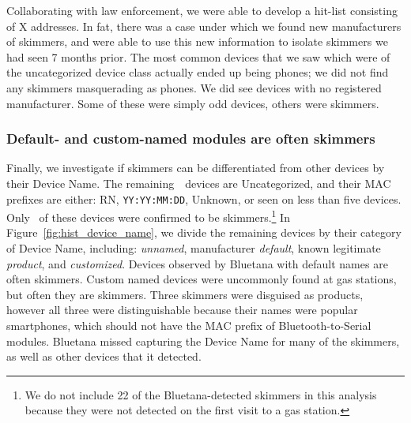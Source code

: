 Collaborating with law
enforcement, we were able to develop a hit-list consisting of X addresses. In
fat, there was a case under which we found new manufacturers of skimmers, and
were able to use this new information to isolate skimmers we had seen 7 months
prior. The most common devices that we saw which were of the uncategorized
device class actually ended up being phones; we did not find any skimmers
masquerading as phones. We did see devices with no registered manufacturer. Some
of these were simply odd devices, others were skimmers.
\fi

\subsubsection*{Default- and custom-named modules are often skimmers} %

Finally, we investigate if skimmers can be differentiated from other devices by
their Device Name.
%
The remaining~\numberBTMACCoDfiltered~devices are Uncategorized, and their MAC prefixes are either: RN, \texttt{YY:YY:MM:DD}, Unknown, or seen on less than five devices.
%
Only
\totalskimmersfirstvisit~of these devices were confirmed to be
skimmers.\footnote{We do not include 22 of the Bluetana-detected skimmers in
this analysis because they were not detected on the first visit to a gas
station.}
%
In Figure~\ref{fig:hist_device_name}, we divide the remaining devices by their
category of Device Name, including: \emph{unnamed}, manufacturer
\emph{default}, known legitimate \emph{product}, and \emph{customized}.
%
Devices observed by Bluetana with default names are often skimmers.
%
Custom named devices were uncommonly found at gas stations, but often they are
skimmers.
%
Three skimmers were disguised as products, however all three were
distinguishable because their names were popular smartphones, which should not
have the MAC prefix of Bluetooth-to-Serial modules.
%
Bluetana missed capturing the Device Name for many of the skimmers, as well as other
devices that it detected.
%
 
%


